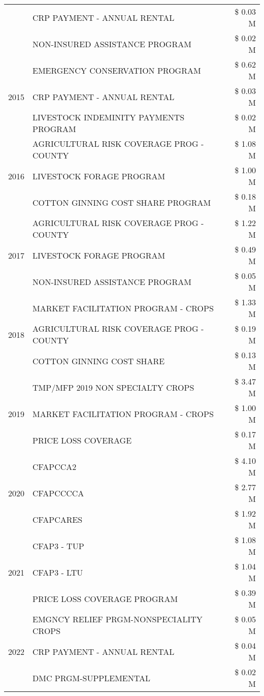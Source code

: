 \begin{tabular}{llr}
 & CRP PAYMENT - ANNUAL RENTAL & \$ 0.03 M \\
 & NON-INSURED ASSISTANCE PROGRAM & \$ 0.02 M \\
\cline{1-3}
\multirow[t]{3}{*}{2015} & EMERGENCY CONSERVATION PROGRAM & \$ 0.62 M \\
 & CRP PAYMENT - ANNUAL RENTAL & \$ 0.03 M \\
 & LIVESTOCK INDEMINITY PAYMENTS PROGRAM & \$ 0.02 M \\
\cline{1-3}
\multirow[t]{3}{*}{2016} & AGRICULTURAL RISK COVERAGE PROG - COUNTY & \$ 1.08 M \\
 & LIVESTOCK FORAGE PROGRAM & \$ 1.00 M \\
 & COTTON GINNING COST SHARE PROGRAM & \$ 0.18 M \\
\cline{1-3}
\multirow[t]{3}{*}{2017} & AGRICULTURAL RISK COVERAGE PROG - COUNTY & \$ 1.22 M \\
 & LIVESTOCK FORAGE PROGRAM & \$ 0.49 M \\
 & NON-INSURED ASSISTANCE PROGRAM & \$ 0.05 M \\
\cline{1-3}
\multirow[t]{3}{*}{2018} & MARKET FACILITATION PROGRAM - CROPS & \$ 1.33 M \\
 & AGRICULTURAL RISK COVERAGE PROG - COUNTY & \$ 0.19 M \\
 & COTTON GINNING COST SHARE & \$ 0.13 M \\
\cline{1-3}
\multirow[t]{3}{*}{2019} & TMP/MFP 2019 NON SPECIALTY CROPS & \$ 3.47 M \\
 & MARKET FACILITATION PROGRAM - CROPS & \$ 1.00 M \\
 & PRICE LOSS COVERAGE & \$ 0.17 M \\
\cline{1-3}
\multirow[t]{3}{*}{2020} & CFAPCCA2 & \$ 4.10 M \\
 & CFAPCCCCA & \$ 2.77 M \\
 & CFAPCARES & \$ 1.92 M \\
\cline{1-3}
\multirow[t]{3}{*}{2021} & CFAP3 - TUP & \$ 1.08 M \\
 & CFAP3 - LTU & \$ 1.04 M \\
 & PRICE LOSS COVERAGE PROGRAM & \$ 0.39 M \\
\cline{1-3}
\multirow[t]{3}{*}{2022} & EMGNCY RELIEF PRGM-NONSPECIALITY CROPS & \$ 0.05 M \\
 & CRP PAYMENT - ANNUAL RENTAL & \$ 0.04 M \\
 & DMC PRGM-SUPPLEMENTAL & \$ 0.02 M \\
\cline{1-3}
\bottomrule
\end{tabular}
